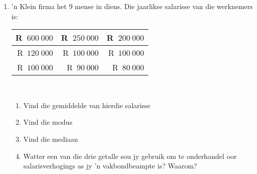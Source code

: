 \begin{eocexercises}{}
\begin{enumerate}[itemsep=6pt, label=\textbf{\arabic*}.]
  \item ’n Klein firma het $9$ mense in diens. Die jaarlikse salarisse van die werknemers is:\\
    \begin{center}
      \begin{tabular}{|r|r|r|} \hline
        R~$600~000$ & R~$250~000$ & R~$200~000$ \\\hline
        R~$120~000$ & R~$100~000$ & R~$100~000$ \\\hline
        R~$100~000$ &  R~$90~000$ &  R~$80~000$ \\\hline
      \end{tabular}
    \end{center}
\vspace {8pt}\\
    \begin{enumerate}[noitemsep, label=\textbf{(\alph*)} ]
    \item Vind die gemiddelde van hierdie salarisse
    \item Vind die modus
    \item Vind die mediaan
    \item Watter een van die drie getalle sou jy gebruik om te onderhandel oor salarisverhogings as jy ’n vakbondbeampte is? Waarom?
    \end{enumerate}

  \end{enumerate}
\end{eocexercises}
